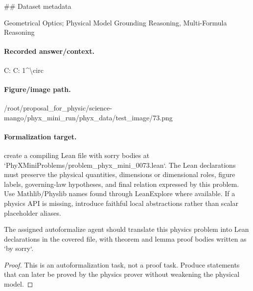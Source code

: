 \#\# Dataset metadata

Geometrical Optics; Physical Model Grounding Reasoning, Multi-Formula Reasoning

\paragraph{Recorded answer/context.}
C: C: 1\textasciicircum{}\textbackslash{}circ

\paragraph{Figure/image path.}
/root/proposal\_for\_physic/science-mango/phyx\_mini\_run/phyx\_data/test\_image/73.png

\paragraph{Formalization target.}
create a compiling Lean file with sorry bodies at `PhyXMiniProblems/problem\_phyx\_mini\_0073.lean`. The Lean declarations must preserve the physical quantities, dimensions or dimensional roles, figure labels, governing-law hypotheses, and final relation expressed by this problem.
Use Mathlib/Physlib names found through LeanExplore where available. If a physics API is missing, introduce faithful local abstractions rather than scalar placeholder aliases.

\begin{theorem}
\label{thm:physics:phyx_mini_0073:target}
The assigned autoformalize agent should translate this physics problem into Lean declarations in the covered file, with theorem and lemma proof bodies written as `by sorry`.
\end{theorem}
\begin{proof}
This is an autoformalization task, not a proof task. Produce statements that can later be proved by the physics prover without weakening the physical model.
\end{proof}

